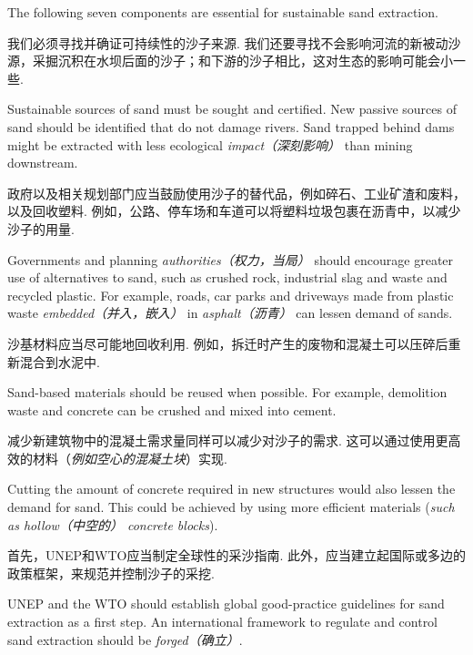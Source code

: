\begin{multicols}{2}
The following seven components are essential for sustainable sand extraction.

我们必须寻找并确证可持续性的沙子来源. 我们还要寻找不会影响河流的新被动沙源，采掘沉积在水坝后面的沙子；和下游的沙子相比，这对生态的影响可能会小一些. 

 Sustainable sources of sand must be sought and certified. New passive sources of sand should be identified that do not damage rivers. Sand trapped behind dams might be extracted with less ecological  \emph{impact（深刻影响）} than mining downstream.



政府以及相关规划部门应当鼓励使用沙子的替代品，例如碎石、工业矿渣和废料，以及回收塑料. 例如，公路、停车场和车道可以将塑料垃圾包裹在沥青中，以减少沙子的用量. 


 Governments and planning  \emph{authorities（权力，当局）} should encourage greater use of alternatives to sand, such as crushed rock, industrial slag and waste and recycled plastic. For example, roads, car parks and driveways made from plastic waste  \emph{embedded（并入，嵌入）} in  \emph{asphalt（沥青）} can lessen demand of sands.


沙基材料应当尽可能地回收利用. 例如，拆迁时产生的废物和混凝土可以压碎后重新混合到水泥中. 

 Sand-based materials should be reused when possible. For example, demolition waste and concrete can be crushed and mixed into cement. 



减少新建筑物中的混凝土需求量同样可以减少对沙子的需求. 这可以通过使用更高效的材料（\textit{例如空心的混凝土块}）实现. 

 Cutting the amount of concrete required in new structures would also lessen the demand for sand. This could be achieved by using more efficient materials (\textit{such as \emph{hollow}（中空的） concrete blocks}). 


首先，UNEP和WTO应当制定全球性的采沙指南. 此外，应当建立起国际或多边的政策框架，来规范并控制沙子的采挖. 

 UNEP and the WTO should establish global good-practice guidelines for sand extraction as a first step. An international framework to regulate and control sand extraction should be \emph{forged（确立）}. 


\end{multicols}
